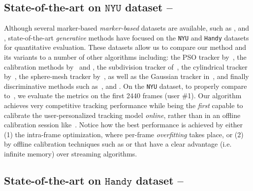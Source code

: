 \subsection{State-of-the-art on $\texttt{NYU}$ dataset --
}
\label{sec:evalstar}
Although several marker-based \emph{marker-based} datasets are available, such as \cite{qian2014realtime}, \cite{sharp2015accurate} and \cite{yuan2017bighand}, state-of-the-art \emph{generative} methods have focused on the \texttt{NYU} \cite{tompson2014real} and \texttt{Handy} \cite{tkach2016sphere} datasets for quantitative evaluation. These datasets allow us to compare our method and its variants to a number of other algorithms including: the PSO tracker by~\cite{sharp2015accurate}, the calibration methods by~\cite{khamis2015learning} and \cite{tan2016fits}, the subdivision tracker of~\cite{taylor2016joint}, the cylindrical tracker by~\cite{htrack}, the sphere-mesh tracker by~\cite{tkach2016sphere}, as well as the Gaussian tracker in~\cite{sridhar2015fast}, and finally discriminative methods such as~\cite{tompson2014real}, \cite{tang2015opening} and \cite{oberweger2015hands}. 
% 
On the \texttt{NYU} dataset, to properly compare to~\cite{taylor2016joint}, we evaluate the metrics on the first 2440 frames (user \#1). Our algorithm achieves very competitive tracking performance while being the \emph{first} capable to calibrate the user-personalized tracking model \emph{online}, rather than in an offline calibration session like~\cite{taylor2016joint}. 
% 
Notice how the best performance is achieved by either (1) the intra-frame optimization, where per-frame \emph{overfitting} takes place, or (2) by offline calibration techniques such as \OfflineSoft{} or \cite{taylor2016joint} that have a clear advantage (i.e. infinite memory) over streaming algorithms.

\subsection{State-of-the-art on $\texttt{Handy}$ dataset --
}






